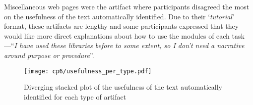 Miscellaneous web pages were the artifact where participants disagreed the most on the usefulness of the text automatically identified.
Due to their `\textit{tutorial}' format, these artifacts are lengthy and some participants expressed that they would like more direct explanations about how to use the modules of each task---``\textit{I have used these libraries before to some extent, so I don't need a narrative around purpose or procedure}''. 



\begin{figure}
    \centering
    \texttt{[image: cp6/usefulness\_per\_type.pdf]}
    \caption{Diverging stacked plot of the usefulness of the text automatically identified for each type of artifact}
    \label{fig:usefulness-by-artifact-type}
\end{figure}




















% 

















